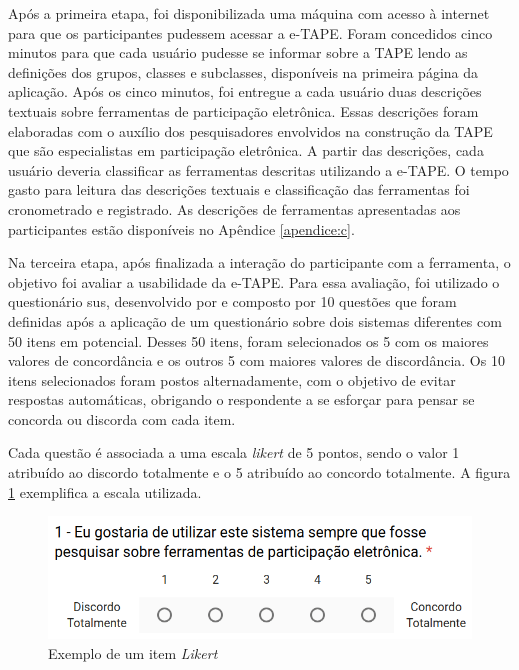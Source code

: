 \par
Após a primeira etapa, foi disponibilizada uma máquina com acesso à internet para que os participantes pudessem acessar a e-TAPE. Foram concedidos cinco minutos para que cada usuário pudesse se informar sobre a TAPE lendo as definições dos grupos, classes e subclasses,
disponíveis na primeira página da aplicação. 
Após os cinco minutos, foi entregue a cada usuário duas descrições textuais sobre ferramentas de participação eletrônica. Essas descrições foram elaboradas com o auxílio dos pesquisadores envolvidos na construção da TAPE que são especialistas em participação eletrônica. 
A partir das descrições, cada usuário deveria classificar as ferramentas descritas utilizando a e-TAPE. O tempo gasto para leitura das descrições textuais e classificação das ferramentas foi cronometrado e registrado.
As descrições de ferramentas apresentadas aos participantes estão disponíveis no Apêndice \ref{apendice:c}.

\par
Na terceira etapa, após finalizada a interação do participante com a ferramenta, o objetivo foi avaliar a usabilidade da e-TAPE.
Para essa avaliação, foi utilizado o questionário \acrfull{sus}, desenvolvido por  e composto por 10 questões que foram definidas após a aplicação de um questionário sobre dois sistemas diferentes com 50 itens em potencial. Desses 50 itens, foram selecionados os 5 com os maiores valores de concordância e os outros 5 com maiores valores de discordância. Os 10 itens selecionados
foram postos alternadamente, com o objetivo de evitar respostas automáticas, obrigando o respondente a se esforçar para pensar se concorda ou discorda com cada item. 

\par

Cada questão é associada a uma escala \textit{likert} de 5 pontos, sendo o valor 1 atribuído ao discordo totalmente e o 5 atribuído ao concordo totalmente.
A figura \ref{fig:exemplo-pergunta} exemplifica a escala utilizada.

\begin{figure}[!ht]
    \centering
    \includegraphics[scale=0.4]{./figuras/exemplo_pergunta.png}
    \caption{Exemplo de um item \textit{Likert}}
    \label{fig:exemplo-pergunta}
\end{figure}

